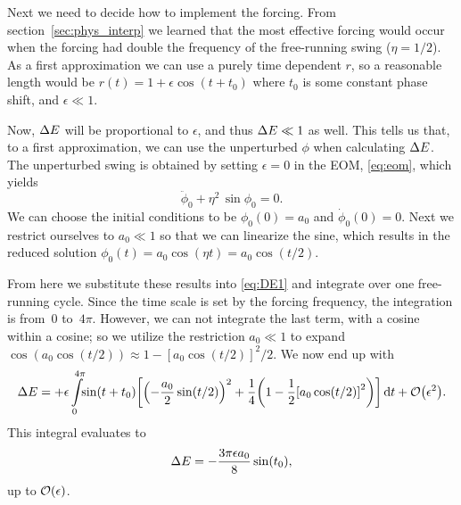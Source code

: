 \documentclass[10pt,letter, swedish, english,%
]{article}
\begin{document}
Next we need to decide how to implement the forcing. From
section~\ref{sec:phys_interp} we learned that the most effective
forcing would occur when the forcing had double the frequency of the
free-running swing ($\eta=1/2$). As a first approximation we can use a purely time
dependent $r$, so a reasonable length would be
$ %
r(t)=1+\epsilon\cos(t+t_0)
$ %
where $t_0$ is some constant phase shift, and $\epsilon\ll1$. 

Now, $\Delta{E}$ will be proportional to $\epsilon$, and thus $\Delta{E}\ll1$ as
well. This tells us that, to a first approximation, we can use the
unperturbed $\phi$ when calculating $\Delta{E}$. The unperturbed swing is
obtained by setting $\epsilon=0$ in the EOM, \eqref{eq:eom}, which
yields
\begin{equation}
\ddot\phi_0+\eta^2\,\sin\phi_0=0.
\end{equation}
We can choose the initial conditions to be $\phi_0(0)=a_0$ and
$\dot\phi_0(0)=0$. Next we restrict ourselves to $a_0\ll1$ so that we
can linearize the sine, which results in the reduced solution
$\phi_0(t)=a_0\cos(\eta t)=a_0\cos(t/2)$.

From here we substitute these results into \eqref{eq:DE1} and
integrate over one free-running cycle. Since the time scale is set by
the forcing frequency, the integration is from~$0$ to~$4\pi$. However,
we can not integrate the last term, with a cosine within a cosine; so
we utilize the restriction $a_0\ll1$ to expand
$\cos(a_0\cos(t/2))\approx1-[a_0\cos(t/2)]^2/2$. 
We now end up with 
\begin{equation}
\DE=+\epsilon\int_0^{4\pi}\!\!\sin(t+t_0)
\qty[\qty(-\frac{a_0}{2}\sin(t/2))^2
+\frac{1}{4}\qty(1-\frac{1}{2}\qty[a_0\cos(t/2)]^2)
]\id{t}+\order{\epsilon^2}.
\end{equation}
This integral evaluates to
\begin{equation}\label{eq:DE_t0}
\DE%
=-\frac{3\pi\epsilon a_0}{8}\sin(t_0),
\end{equation}
up to $\order{\epsilon}$.
\end{document}
